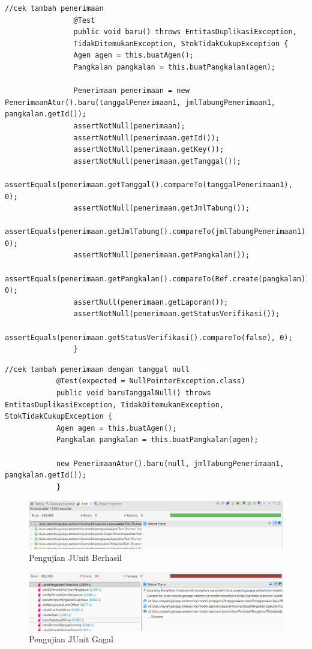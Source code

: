 			\begin{lstlisting}[caption=Potongan kode Pengujian JUnit dengan kasus berhasil (\textit{test success}), label=testSuccess]
				//cek tambah penerimaan
				@Test
				public void baru() throws EntitasDuplikasiException,
				TidakDitemukanException, StokTidakCukupException {
				Agen agen = this.buatAgen();
				Pangkalan pangkalan = this.buatPangkalan(agen);
				
				Penerimaan penerimaan = new PenerimaanAtur().baru(tanggalPenerimaan1, jmlTabungPenerimaan1, pangkalan.getId());
				assertNotNull(penerimaan);
				assertNotNull(penerimaan.getId());
				assertNotNull(penerimaan.getKey());
				assertNotNull(penerimaan.getTanggal());
				assertEquals(penerimaan.getTanggal().compareTo(tanggalPenerimaan1), 0);
				assertNotNull(penerimaan.getJmlTabung());
				assertEquals(penerimaan.getJmlTabung().compareTo(jmlTabungPenerimaan1), 0);
				assertNotNull(penerimaan.getPangkalan());
				assertEquals(penerimaan.getPangkalan().compareTo(Ref.create(pangkalan)), 0);
				assertNull(penerimaan.getLaporan());
				assertNotNull(penerimaan.getStatusVerifikasi());
				assertEquals(penerimaan.getStatusVerifikasi().compareTo(false), 0);
				}
			\end{lstlisting}
			
				\begin{lstlisting}[caption=Potongan kode Pengujian JUnit dengan kasus gagal (\textit{test fail}), label=testFail]
			//cek tambah penerimaan dengan tanggal null
			@Test(expected = NullPointerException.class)
			public void baruTanggalNull() throws EntitasDuplikasiException, TidakDitemukanException, StokTidakCukupException {
			Agen agen = this.buatAgen();
			Pangkalan pangkalan = this.buatPangkalan(agen);
			
			new PenerimaanAtur().baru(null, jmlTabungPenerimaan1, pangkalan.getId());
			}
			\end{lstlisting}
		
			\begin{figure}[H]
				\center
				\includegraphics [width = 14cm]{gambar/kode/junit-success}
				\caption{Pengujian JUnit Berhasil}
				\label{junitSuccess}
			\end{figure}
		
			\begin{figure}[H]
				\center
				\includegraphics [width = 14cm]{gambar/kode/junit-fail}
				\caption{Pengujian JUnit Gagal}
				\label{junitFail}
			\end{figure}
	
